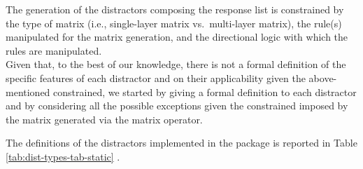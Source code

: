 The generation of the distractors composing the response list is constrained by the type of matrix (i.e., single-layer matrix vs.~multi-layer matrix), the rule(s) manipulated for the matrix generation, and the directional logic with which the rules are manipulated.\\
Given that, to the best of our knowledge, there is not a formal definition of the specific features of each distractor and on their applicability given the above-mentioned constrained, we started by giving a formal definition to each distractor and by considering all the possible exceptions given the constrained imposed by the matrix generated via the matrix operator.

The definitions of the distractors implemented in the  package is reported in Table \ref{tab:dist-types-tab-static} .

